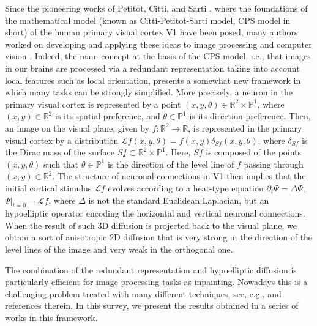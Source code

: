 \documentclass[proc]{edpsmath}
\begin{document}
Since the pioneering works of Petitot, Citti, and Sarti \cite{petitot,citti-sarti}, where the foundations of the mathematical model (known as Citti-Petitot-Sarti model, CPS model in short) of the human primary visual cortex V1 have been posed, many authors worked on developing and applying these ideas to image processing and computer vision \cite{Duits2010,Duits2010a,Sanguinetti,Bredies13,Hladky}. Indeed, the main concept at the basis of the CPS model, i.e., that images in our brains are processed via a redundant representation taking into account local features such as local orientation, presents a somewhat new framework in which many tasks can be strongly simplified.
  More precisely, a neuron in the primary visual cortex is represented by a point  $(x,y,\theta)\in\mathbb R^2\times \mathbb P^1$, where $(x,y)\in\mathbb R^2$ is its spatial preference, and $\theta\in\mathbb P^1$ is its direction preference.
  Then, an image on the visual plane, given by $f:\mathbb R^2\to \mathbb R$, is represented in the primary visual cortex by a distribution $\mathcal L f(x,y,\theta)=f(x,y)\delta_{Sf}(x,y,\theta)$, where $\delta_{Sf}$ is the Dirac mass of the surface $Sf\subset \mathbb R^2\times \mathbb P^1$. Here, $Sf$ is composed of the points $(x,y,\theta)$ such that $\theta\in\mathbb P^1$ is the direction of the level line of $f$ passing through $(x,y)\in\mathbb R^2$.
  The structure of neuronal connections in V1 then implies that the initial cortical stimulus $\mathcal Lf$ evolves 
  according to a heat-type equation $\partial_t \Psi=\Delta \Psi$, $\Psi|_{t=0}=\mathcal Lf$, where $\Delta$ is not the standard Euclidean Laplacian, but an hypoelliptic operator encoding the horizontal and vertical neuronal connections.
  When the result of such 3D diffusion is projected back to the visual plane, we obtain a sort of anisotropic 2D diffusion that is very strong in the direction of the level lines of the image and very weak in the orthogonal one.
  
  The combination of the redundant representation and hypoelliptic diffusion is particularly efficient for image processing tasks as inpainting. Nowadays this is a challenging problem treated with many different techniques, see, e.g., \cite{Bertalmio2000,Bertalmio2001,Masnou2002,Chan2002,Criminisi2004a} and references therein.
In this survey, we present the results obtained in a series of works \cite{Boscain2012a, Remizov2013, Boscain2014, ahe, gros-papier} in this framework. 
\end{document}
